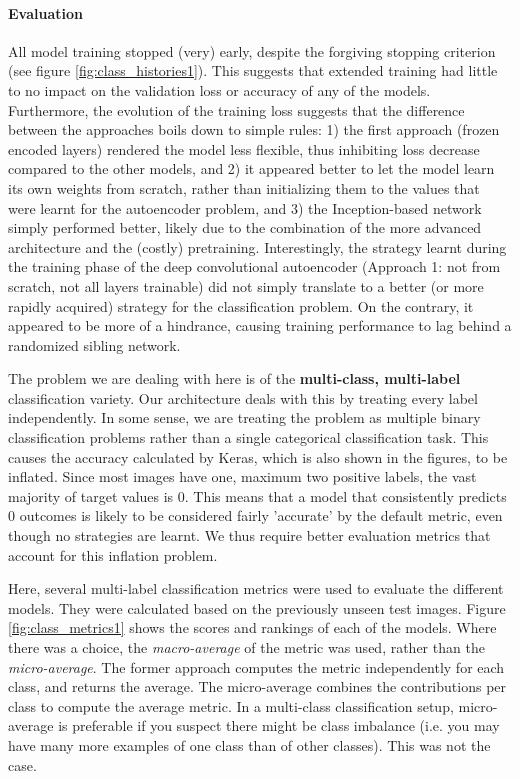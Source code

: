\paragraph{Evaluation}
All model training stopped (very) early, despite the forgiving stopping criterion (see figure \ref{fig:class_histories1}). This suggests that extended training had little to no impact on the validation loss or accuracy of any of the models. Furthermore, the evolution of the training loss suggests that the difference between the approaches boils down to simple rules: 1) the first approach (frozen encoded layers) rendered the model less flexible, thus inhibiting loss decrease compared to the other models, and 2) it appeared better to let the model learn its own weights from scratch, rather than initializing them to the values that were learnt for the autoencoder problem, and 3) the Inception-based network simply performed better, likely due to the combination of the more advanced architecture and the (costly) pretraining. Interestingly, the strategy learnt during the training phase of the deep convolutional autoencoder (Approach 1: not from scratch, not all layers trainable) did not simply translate to a better (or more rapidly acquired) strategy for the classification problem. On the contrary, it appeared to be more of a hindrance, causing training performance to lag behind a randomized sibling network.

The problem we are dealing with here is of the \textbf{multi-class, multi-label} classification variety. Our architecture deals with this by treating every label independently. In some sense, we are treating the problem as multiple binary classification problems rather than a single categorical classification task. This causes the accuracy calculated by Keras, which is also shown in the figures, to be inflated. Since most images have one, maximum two positive labels, the vast majority of target values is 0. This means that a model that consistently predicts 0 outcomes is likely to be considered fairly 'accurate' by the default metric, even though no strategies are learnt. We thus require better evaluation metrics that account for this inflation problem.

Here, several multi-label classification metrics were used to evaluate the different models. They were calculated based on the previously unseen test images. Figure \ref{fig:class_metrics1} shows the scores and rankings of each of the models. Where there was a choice, the \textit{macro-average} of the metric was used, rather than the \textit{micro-average}. The former approach computes the metric independently for each class, and returns the average. The micro-average combines the contributions per class to compute the average metric.  In a multi-class classification setup, micro-average is preferable if you suspect there might be class imbalance (i.e. you may have many more examples of one class than of other classes). This was not the case.

